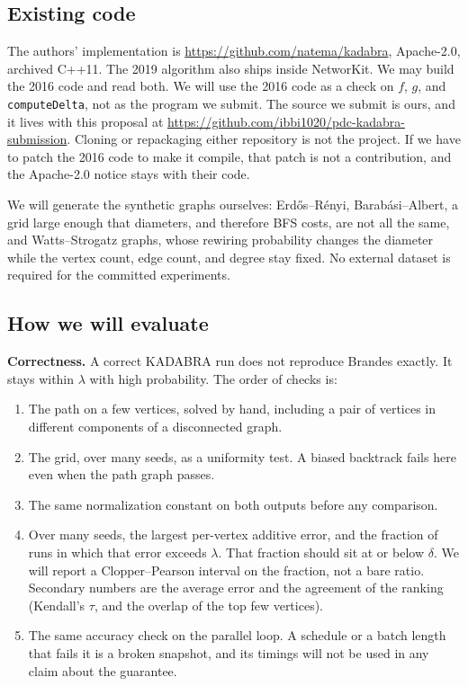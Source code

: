 \documentclass[11pt]{article}
\begin{document}
\subsection{Existing code}

The authors' implementation is \url{https://github.com/natema/kadabra}, Apache-2.0, archived C++11. The 2019 algorithm also ships inside NetworKit. We may build the 2016 code and read both. We will use the 2016 code as a check on $f$, $g$, and \texttt{computeDelta}, not as the program we submit. The source we submit is ours, and it lives with this proposal at \url{https://github.com/ibbi1020/pdc-kadabra-submission}. Cloning or repackaging either repository is not the project. If we have to patch the 2016 code to make it compile, that patch is not a contribution, and the Apache-2.0 notice stays with their code.

We will generate the synthetic graphs ourselves: Erd\H{o}s--R\'enyi, Barab\'asi--Albert, a grid large enough that diameters, and therefore BFS costs, are not all the same, and Watts--Strogatz graphs, whose rewiring probability changes the diameter while the vertex count, edge count, and degree stay fixed. No external dataset is required for the committed experiments.

\subsection{How we will evaluate}

\textbf{Correctness.} A correct KADABRA run does not reproduce Brandes exactly. It stays within $\lambda$ with high probability. The order of checks is:

\begin{enumerate}
\item The path on a few vertices, solved by hand, including a pair of vertices in different components of a disconnected graph.
\item The grid, over many seeds, as a uniformity test. A biased backtrack fails here even when the path graph passes.
\item The same normalization constant on both outputs before any comparison.
\item Over many seeds, the largest per-vertex additive error, and the fraction of runs in which that error exceeds $\lambda$. That fraction should sit at or below $\delta$. We will report a Clopper--Pearson interval on the fraction, not a bare ratio. Secondary numbers are the average error and the agreement of the ranking (Kendall's $\tau$, and the overlap of the top few vertices).
\item The same accuracy check on the parallel loop. A schedule or a batch length that fails it is a broken snapshot, and its timings will not be used in any claim about the guarantee.
\end{enumerate}
\end{document}
